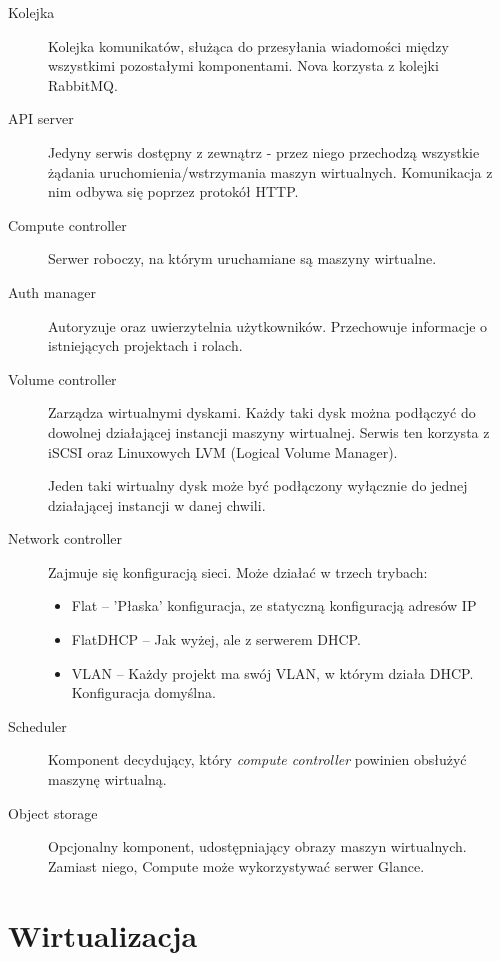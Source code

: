 \begin{description}

\item[Kolejka]
Kolejka komunikatów, służąca do przesyłania wiadomości między wszystkimi pozostałymi komponentami. Nova korzysta z kolejki RabbitMQ.

\item[API server]
Jedyny serwis dostępny z zewnątrz - przez niego przechodzą wszystkie żądania uruchomienia/wstrzymania maszyn wirtualnych. Komunikacja z nim odbywa się poprzez protokół HTTP. 

\item[Compute controller]
Serwer roboczy, na którym uruchamiane są maszyny wirtualne.

\item[Auth manager]
Autoryzuje oraz uwierzytelnia użytkowników. Przechowuje informacje o istniejących projektach i rolach.

\item[Volume controller]
Zarządza wirtualnymi dyskami. Każdy taki dysk można podłączyć do dowolnej działającej instancji maszyny wirtualnej. Serwis ten korzysta z iSCSI oraz Linuxowych LVM (Logical Volume Manager).

Jeden taki wirtualny dysk może być podłączony wyłącznie do jednej działającej instancji w danej chwili.

\item[Network controller]
Zajmuje się konfiguracją sieci. Może działać w trzech trybach:
\begin{itemize}
\item Flat -- 'Płaska' konfiguracja, ze statyczną konfiguracją adresów IP
\item FlatDHCP -- Jak wyżej, ale z serwerem DHCP.
\item VLAN -- Każdy projekt ma swój VLAN, w którym działa DHCP. Konfiguracja domyślna.
\end{itemize}

\item[Scheduler]
Komponent decydujący, który {\it compute controller} powinien obsłużyć maszynę wirtualną.

\item[Object storage]
Opcjonalny komponent, udostępniający obrazy maszyn wirtualnych. Zamiast niego, Compute może wykorzystywać serwer Glance.

\end{description}

\section{Wirtualizacja}

